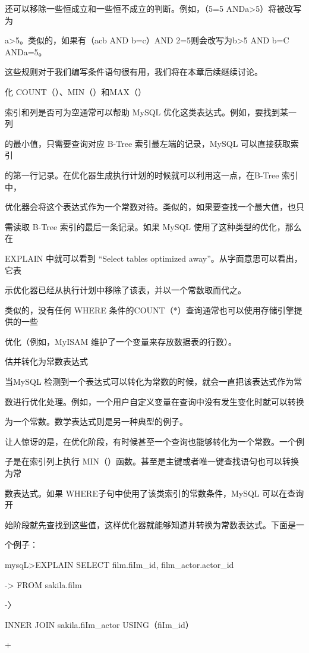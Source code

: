 还可以移除一些恒成立和一些恒不成立的判断。例如，（5=5 ANDa>5）将被改写为

a>5。类似的，如果有（acb AND b=c）AND 2=5则会改写为b>5 AND b=C ANDa=5。

这些规则对于我们编写条件语句很有用，我们将在本章后续继续讨论。

化 COUNT（）、MIN（）和MAX（）

索引和列是否可为空通常可以帮助 MySQL 优化这类表达式。例如，要找到某一列

的最小值，只需要查询对应 B-Tree 索引最左端的记录，MySQL 可以直接获取索引

的第一行记录。在优化器生成执行计划的时候就可以利用这一点，在B-Tree 索引中，

优化器会将这个表达式作为一个常数对待。类似的，如果要查找一个最大值，也只

需读取 B-Tree 索引的最后一条记录。如果 MySQL 使用了这种类型的优化，那么在

EXPLAIN 中就可以看到 “Select tables optimized away”。从字面意思可以看出，它表

示优化器已经从执行计划中移除了该表，并以一个常数取而代之。

类似的，没有任何 WHERE 条件的COUNT（*）查询通常也可以使用存储引擎提供的一些

优化（例如，MyISAM 维护了一个变量来存放数据表的行数）。

估并转化为常数表达式

当MySQL 检测到一个表达式可以转化为常数的时候，就会一直把该表达式作为常

数进行优化处理。例如，一个用户自定义变量在查询中没有发生变化时就可以转换

为一个常数。数学表达式则是另一种典型的例子。

让人惊讶的是，在优化阶段，有时候甚至一个查询也能够转化为一个常数。一个例

子是在索引列上执行 MIN（）函数。甚至是主键或者唯一键查找语句也可以转换为常

数表达式。如果 WHERE子句中使用了该类索引的常数条件，MySQL 可以在查询开

始阶段就先查找到这些值，这样优化器就能够知道并转换为常数表达式。下面是一

个例子：

mysqL>EXPLAIN SELECT film.fiIm\_id, film\_actor.actor\_id

-> FROM sakila.film

-〉

INNER JOIN sakila.fiIm\_actor USING（fiIm\_id）

+

